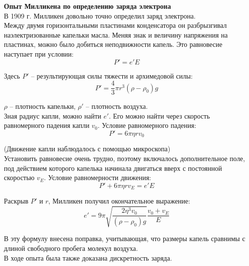 \documentclass{article}
\begin{document}
	
	\textbf{Опыт Милликена по определению заряда электрона}\\

	В 1909 г. Милликен довольно точно определил заряд электрона.\\

	Между двумя горизонтальными пластинами конденсатора он разбрызгивал наэлектризованные капельки масла. Меняя знак и величину напряжения на пластинах, можно было добиться неподвижности капель. Это равновесие наступает при условии:
	\begin{equation}
		P' = e'E
	\end{equation}

	Здесь $P'$ -- результирующая силы тяжести и архимедовой силы:
	\begin{equation}
		P' = \frac{4}{3}\pi r^3 (\rho - \rho_0)g
	\end{equation}

	$\rho$ -- плотность капельки, $\rho'$ -- плотность воздуха.\\

	Зная радиус капли, можно найти $e'$. Его можно найти через скорость равномерного падения капли $v_0$. Условие равномерного падения:
	\begin{equation}
		P' = 6\pi\eta r v_0
	\end{equation}

	(Движение капли наблюдалось с помощью микроскопа)\\

	Установить равновесие очень трудно, поэтому включалось дополнительное поле, под действием которого капелька начинала двигаться вверх с постоянной скоростью $v_E$. Условие равномерности движения:
	\begin{equation}
		P' + 6\pi\eta r v_E = e'E
	\end{equation}

	Раскрыв $P'$ и $r$, Милликен получил окончательное выражение:
	\begin{equation}
		e' = 9\pi\sqrt{\frac{2\eta^3 v_0}{(\rho-\rho_0)g}}\frac{v_0+v_E}{E}
	\end{equation}

	В эту формулу внесена поправка, учитывающая, что размеры капель сравнимы с длиной свободного пробега молекул воздуха.\\

	В ходе опыта была также доказана дискретность заряда.
\end{document}
